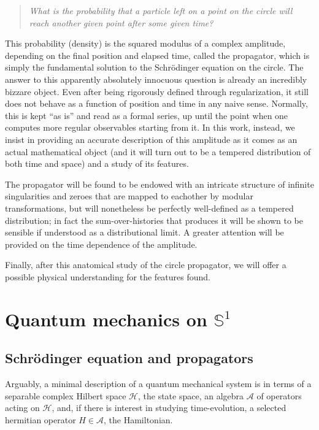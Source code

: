 \documentclass{article}
\newcommand{\ess}{\ensuremath{\mathbb{S}}}
\newcommand{\hil}{\ensuremath{\mathcal{H}}}
\begin{document}
\vspace{2em}

\begin{quote} \emph{What is the probability that a particle left on a point on the circle will reach another given point after some given time?} \end{quote}

\vspace{2em}

This probability (density) is the squared modulus of a complex amplitude, depending on the final position and elapsed time, called the propagator, which is simply the fundamental solution to the Schr\"odinger equation on the circle. The answer to this apparently absolutely innocuous question is already an incredibly bizzare object. Even after being rigorously defined through regularization, it still does not behave as a function of position and time in any naive sense. Normally, this is kept ``as is'' and read as a formal series, up until the point when one computes more regular observables starting from it. In this work, instead, we insist in providing an accurate description of this amplitude as it comes as an actual mathematical object (and it will turn out to be a tempered distribution of both time and space) and a study of its features.

The propagator will be found to be endowed with an intricate structure of infinite singularities and zeroes that are mapped to eachother by modular transformations, but will nonetheless be perfectly well-defined as a tempered distribution; in fact the sum-over-histories that produces it will be shown to be sensible if understood as a distributional limit. A greater attention will be provided on the time dependence of the amplitude.

Finally, after this anatomical study of the circle propagator, we will offer a possible physical understanding for the features found.

\section{Quantum mechanics on $\ess^1$}
\subsection{Schr\"odinger equation and propagators}

Arguably, a minimal description of a quantum mechanical system is in terms of a separable complex Hilbert space $\hil$, the state space, an algebra $\mathcal{A}$ of operators acting on $\hil$, and, if there is interest in studying time-evolution, a selected hermitian operator $H \in \mathcal{A}$, the Hamiltonian.  
\end{document}
